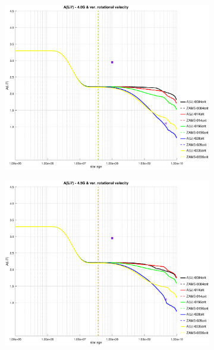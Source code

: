 \documentclass[fleqn,usenatbib]{mnras}
\begin{document}
\begin{figure}
    \begin{subfigure}[h]{0.47\textwidth}
    \includegraphics[trim = 40mm 15mm 20mm 15mm, clip,width=\textwidth]{figures/li_var_vel_4_0g.eps}
    \label{fig:subim3}
    \end{subfigure}
    \begin{subfigure}[h]{0.47\textwidth}
    \includegraphics[trim = 40mm 15mm 20mm 15mm, clip,width=\textwidth]{figures/li_var_vel_4_5g.eps}
    \label{fig:subim4}
    \end{subfigure}
    

\end{figure}
\end{document}

